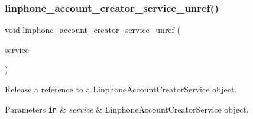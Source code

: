 \subsubsection{linphone\+\_\+account\+\_\+creator\+\_\+service\+\_\+unref()}
{\footnotesize\ttfamily void linphone\+\_\+account\+\_\+creator\+\_\+service\+\_\+unref (\begin{DoxyParamCaption}\item[{\textbf{ Linphone\+Account\+Creator\+Service} $\ast$}]{service }\end{DoxyParamCaption})}



Release a reference to a Linphone\+Account\+Creator\+Service object. 


\begin{DoxyParams}[1]{Parameters}
\mbox{\tt in}  & {\em service} & Linphone\+Account\+Creator\+Service object.  \\
\hline
\end{DoxyParams}

